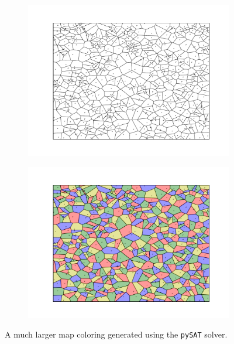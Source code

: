 \documentclass{article}
\begin{document}
    \vspace{-8mm}
    \begin{figure}[H]
        \centering
        \begin{subfigure}{0.49\textwidth}
            \centering
            \includegraphics[scale = .5]{sp23/hw-supplements/hw3-supp/blank_map2.pdf}
        \end{subfigure}
        \begin{subfigure}{0.49\textwidth}
            \centering
            \includegraphics[scale = .5]{sp23/hw-supplements/hw3-supp/colored_map2.pdf}
        \end{subfigure}
        \caption{A much larger map coloring generated using the \lstinline{pySAT} solver.}
        \label{fig:pySAT}
    \end{figure}
\end{document}
